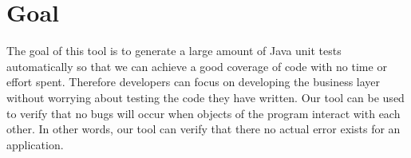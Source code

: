 \section{Goal}
\label{sec:Goal}
The goal of this tool is to generate a large amount of Java unit tests automatically so that we can achieve a good coverage of code with no time or effort spent. Therefore developers can focus on developing the business layer without worrying about testing the code they have written.
Our tool can be used to verify that no bugs will occur when objects of the program interact with each other. In other words, our tool can verify that there no actual error exists for an application.